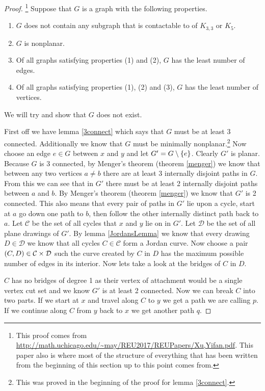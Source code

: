 \documentclass{article}
\begin{document}
\begin{proof}\footnote{This proof comes from \url{http://math.uchicago.edu/~may/REU2017/REUPapers/Xu,Yifan.pdf}. This paper also is where most of the structure of everything that has been written from the beginning of this section up to this point comes from.}
	Suppose that $G$ is a graph with the following properties.
	\begin{enumerate}
		\item $G$ does not contain any subgraph that is contactable to of $K_{3,3}$ or $K_5$.
		\item $G$ is nonplanar.
		\item Of all graphs satisfying properties (1) and (2), $G$ has the least number of edges.
		\item Of all graphs satisfying properties (1), (2) and (3), $G$ has the least number of vertices.
	\end{enumerate}
	We will try and show that $G$ does not exist.

	First off we have lemma \ref{3connect} which says that $G$ must be at least 3 connected. Additionally we know that $G$ must be minimally nonplanar.\footnote{This was proved in the beginning of the proof for lemma \ref{3connect}.} Now choose an edge $e \in G$ between $x$ and $y$ and let $G' = G\setminus\left\{ {e} \right\}$. Clearly $G'$ is planar. Because $G$ is 3 connected, by Menger's theorem (theorem \ref{menger}) we know that between any two vertices $a\not=b$ there are at least 3 internally disjoint paths in $G$. From this we can see that in $G'$ there must be at least 2 internally disjoint paths between $a$ and $b$. By Menger's theorem (theorem \ref{menger}) we know that $G'$ is 2 connected. This also means that every pair of paths in $G'$ lie upon a cycle, start at $a$ go down one path to $b$, then follow the other internally distinct path back to $a$. Let $\mathcal C$ be the set of all cycles that $x$ and $y$ lie on in $G'$. Let $\mathcal D$ be the set of all plane drawings of $G'$. By lemma \ref{JordansLemma} we know that every drawing $D\in\mathcal D$ we know that all cycles $C\in\mathcal C$ form a Jordan curve. Now choose a pair $\left( {C} , {D} \right) \in \mathcal C\times\mathcal D$ such the curve created by $C$ in $D$ has the maximum possible number of edges in its interior. Now lets take a look at the bridges of $C$ in $D$.
	
	$C$ has no bridges of degree 1 as their vertex of attachment would be a single vertex cut set and we know $G'$ is at least 2 connected. Now we can break $C$ into two parts. If we start at $x$ and travel along $C$ to $y$ we get a path we are calling $p$. If we continue along $C$ from $y$ back to $x$ we get another path $q$.
	

\end{proof}
\end{document}
